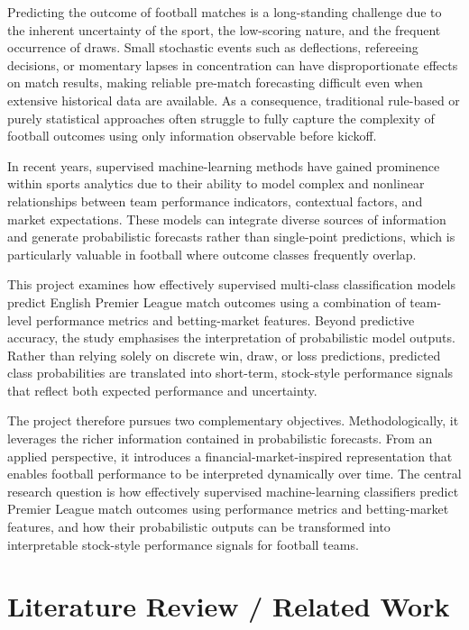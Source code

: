 \documentclass[11pt,a4paper]{article}
\begin{document}
Predicting the outcome of football matches is a long-standing challenge due to the inherent uncertainty of the sport, the low-scoring nature, and the frequent occurrence of draws. Small stochastic events such as deflections, refereeing decisions, or momentary lapses in concentration can have disproportionate effects on match results, making reliable pre-match forecasting difficult even when extensive historical data are available. As a consequence, traditional rule-based or purely statistical approaches often struggle to fully capture the complexity of football outcomes using only information observable before kickoff.

In recent years, supervised machine-learning methods have gained prominence within sports analytics due to their ability to model complex and nonlinear relationships between team performance indicators, contextual factors, and market expectations. These models can integrate diverse sources of information and generate probabilistic forecasts rather than single-point predictions, which is particularly valuable in football where outcome classes frequently overlap.

This project examines how effectively supervised multi-class classification models predict English Premier League match outcomes using a combination of team-level performance metrics and betting-market features. Beyond predictive accuracy, the study emphasises the interpretation of probabilistic model outputs. Rather than relying solely on discrete win, draw, or loss predictions, predicted class probabilities are translated into short-term, stock-style performance signals that reflect both expected performance and uncertainty.

The project therefore pursues two complementary objectives. Methodologically, it leverages the richer information contained in probabilistic forecasts. From an applied perspective, it introduces a financial-market-inspired representation that enables football performance to be interpreted dynamically over time. The central research question is how effectively supervised machine-learning classifiers predict Premier League match outcomes using performance metrics and betting-market features, and how their probabilistic outputs can be transformed into interpretable stock-style performance signals for football teams.


\section{Literature Review / Related Work}
\label{sec:literature}
\end{document}

